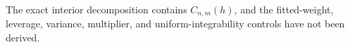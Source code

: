 The exact interior decomposition contains \(C_{n,m}(h)\), and the fitted-weight, leverage, variance, multiplier, and uniform-integrability controls have not been derived.